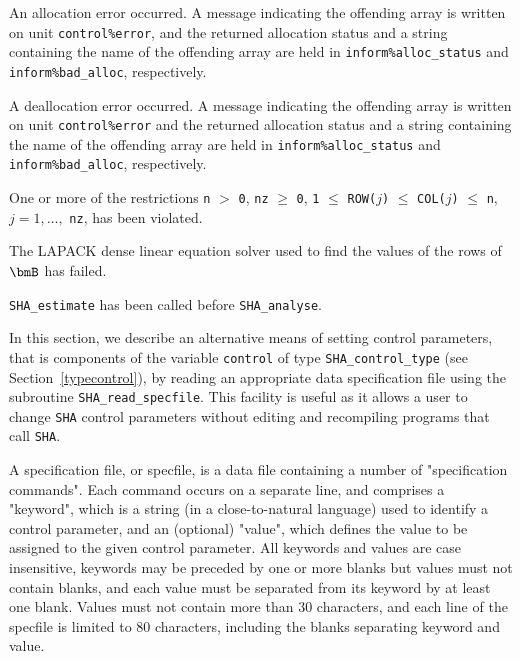 \documentclass{galahad}
\newcommand{\packagename}{SHA}
\begin{document}
\begin{description}

 An allocation error occurred.
A message indicating the offending
array is written on unit {\tt control\%error}, and the returned allocation
status and a string containing the name of the offending array
are held in {\tt inform\%alloc\_\-status}
and {\tt inform\%bad\_alloc}, respectively.

 A deallocation error occurred.
A message indicating the offending
array is written on unit {\tt control\%error} and the returned allocation
status and a string containing the name of the offending array
are held in {\tt inform\%alloc\_\-status}
and {\tt inform\%bad\_alloc}, respectively.

One or more of the restrictions
{\tt n} $>$ {\tt 0},  {\tt nz} $\ge$ {\tt 0},
{\tt 1} $\le$ {\tt ROW(}$j${\tt )} $\le$ {\tt COL(}$j${\tt )} $\le$ {\tt n},
$j = 1, \ldots,$ {\tt nz},
has been violated.

The LAPACK dense linear equation solver used to find the values of
the rows of $\bmB$ has failed.

  {\tt \packagename\_estimate} has been called
before {\tt \packagename\_analyse}.

\end{description}


\galfeatures
\noindent In this section, we describe an alternative means of setting
control parameters, that is components of the variable {\tt control} of type
{\tt \packagename\_control\_type}
(see Section~\ref{typecontrol}),
by reading an appropriate data specification file using the
subroutine {\tt \packagename\_read\_specfile}. This facility
is useful as it allows a user to change  {\tt \packagename} control parameters
without editing and recompiling programs that call {\tt \packagename}.

A specification file, or specfile, is a data file containing a number of
"specification commands". Each command occurs on a separate line,
and comprises a "keyword",
which is a string (in a close-to-natural language) used to identify a
control parameter, and
an (optional) "value", which defines the value to be assigned to the given
control parameter. All keywords and values are case insensitive,
keywords may be preceded by one or more blanks but
values must not contain blanks, and
each value must be separated from its keyword by at least one blank.
Values must not contain more than 30 characters, and
each line of the specfile is limited to 80 characters,
including the blanks separating keyword and value.
\end{document}
